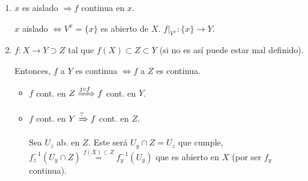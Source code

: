 \begin{obs}
\begin{enumerate}
    \item $x$ es aislado $\Rightarrow f$ continua en $x$. 
    \begin{demo}
        $x$ aislado $\Leftrightarrow V^x = \{x\}$ es abierto de $X$. $f|_{V^x} : \{x\} \rightarrow Y$.
    \end{demo}

    \item $f: X \rightarrow Y \supset Z$ tal que $f\left( X \right) \subset Z \subset Y$ (si no es así puede estar mal definido).

    Entonces, $f$ a $Y$ es continua $\Leftrightarrow f$ a $Z$ es continua.
    \begin{demo}
        \begin{itemize}
            \item $f$ cont. en $Z \xRightarrow{j \circ f} f$ cont. en $Y$. %
            \item $f$ cont. en $Y \xRightarrow{?} f$ cont. en $Z$. 

            Sea $U_z$ ab. en $Z$. Este será $U_y \cap Z = U_z$ que cumple, $f_z^{-1}\left( U_y \cap Z \right) \stackrel{f\left( X \right) \subset Z}{=}  f_y^{-1}\left( U_y \right)$ que es abierto en $X$ (por ser $f_y$ continua).
        \end{itemize}
    \end{demo}
\end{enumerate}
\end{obs}

